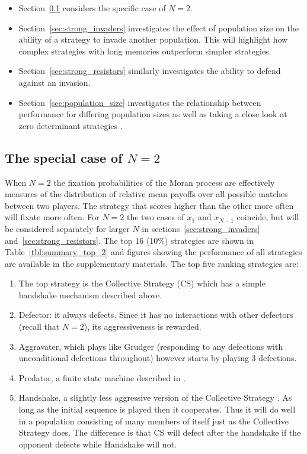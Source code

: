 \documentclass[10pt,journal]{IEEEtran}
\begin{document}
\begin{itemize}
    \item Section~\ref{sec:two_individuals} considers the specific case of
        \(N=2\).
    \item Section~\ref{sec:strong_invaders} investigates the effect of
        population size on the ability of a strategy to invade another
        population. This will highlight how complex strategies with long
        memories outperform simpler strategies.
    \item Section~\ref{sec:strong_resistors} similarly investigates the
        ability to defend against an invasion.
    \item Section~\ref{sec:population_size} investigates the relationship
        between performance for differing population sizes as well as
        taking a close look at zero determinant strategies \cite{Press2012}.
\end{itemize}

\subsection{The special case of \(N=2\)}\label{sec:two_individuals}

When $N=2$ the fixation probabilities of the Moran process are effectively measures
of the distribution of  relative
mean payoffs over all possible matches between two players. The strategy
that scores higher than the other more often will fixate more often. For \(N=2\)
the two cases of \(x_1\) and \(x_{N-1}\) coincide, but will be
considered separately for larger \(N\) in sections~\ref{sec:strong_invaders}
and~\ref{sec:strong_resistors}. The top 16 (10\%) strategies are
shown in
Table~\ref{tbl:summary_top_2} and figures showing the performance of all
strategies are available in the supplementary materials. 
The top five ranking strategies are:

\begin{enumerate}
    \item The top strategy is the Collective Strategy (CS) which has a simple
        handshake mechanism described above.
    \item Defector: it always defects. Since it has no interactions with other
        defectors (recall that \(N=2\)), its aggressiveness is rewarded.
    \item Aggravater, which plays like Grudger (responding to any
        defections with unconditional defections throughout) however starts by
        playing 3 defections.
    \item Predator, a finite state machine described in \cite{Ashlock2006}.
    \item Handshake, a slightly less aggressive version of the Collective
        Strategy \cite{Robson1990}. As long as the initial sequence is played
        then it cooperates. Thus it will do well in a population consisting of
        many members of itself just as the Collective Strategy does. The
        difference is that CS will defect after the handshake if the opponent
        defects while Handshake will not.
\end{enumerate}
\end{document}
